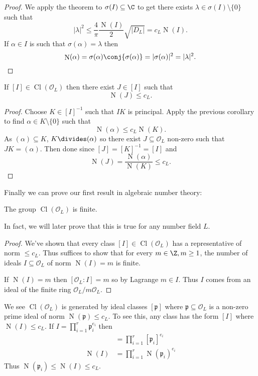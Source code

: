 \documentclass[a4paper]{article}
\renewcommand*{\O}{\mathcal{O}}
\DeclareMathOperator{\n}{N}
\DeclareMathOperator{\Cl}{Cl} %
\begin{document}
\begin{proof}
  We apply the theorem to \(\sigma(I) \subseteq \C\) to get there exists \(\lambda \in \sigma(I) \setminus \{0\}\) such that
  \[
    |\lambda|^2 \leq \frac{4}{\pi} \frac{\n(I)}{2} \sqrt{|D_L|} = c_L \n(I).
  \]
  If \(\alpha \in I\) is such that \(\sigma(\alpha) = \lambda\) then
  \[
    \n(\alpha)
    = \sigma(\alpha) \conj{\sigma(\alpha)}
    = |\sigma(\alpha)|^2
    = |\lambda|^2.
  \]
\end{proof}

\begin{corollary}
  If \([I] \in \Cl(\O_L)\) then there exist \(J \in [I]\) such that
  \[
    \n(J) \leq c_L.
  \]
\end{corollary}

\begin{proof}
  Choose \(K \in [I]^{-1}\) such that \(IK\) is principal. Apply the previous corollary to find \(\alpha \in K \setminus \{0\}\) such that
  \[
    \n(\alpha) \leq c_L \n(K).
  \]
  As \((\alpha) \subseteq K\), \(K \divides (\alpha)\) so there exist \(J \subseteq \O_L\) non-zero such that \(JK = (\alpha)\). Then done since \([J] = [K]^{-1} = [I]\) and
  \[
    \n(J) = \frac{\n(\alpha)}{\n(K)} \leq c_L.
  \]
\end{proof}

Finally we can prove our first result in algebraic number theory:

\begin{theorem}
  The group \(\Cl(\O_L)\) is finite.
\end{theorem}

In fact, we will later prove that this is true for any number field \(L\).

\begin{proof}
  We've shown that every class \([I] \in \Cl(\O_L)\) has a representative of norm \(\leq c_L\). Thus suffices to show that for every \(m \in \Z, m \geq 1\), the number of ideals \(I \subseteq \O_L\) of norm \(\n(I) = m\) is finite.

  If \(\n(I) = m\) then \([\O_L:I] = m\) so by Lagrange \(m \in I\). Thus \(I\) comes from an ideal of the finite ring \(\O_L/m\O_L\).
\end{proof}

\begin{note}
  We see \(\Cl(\O_L)\) is generated by ideal classes \([\mathfrak p]\) where \(\mathfrak p \subseteq \O_L\) is a non-zero prime ideal of norm \(\n(\mathfrak p) \leq c_L\). To see this, any class has the form \([I]\) where \(\n(I) \leq c_L\). If \(I = \prod_{i = 1}^r \mathfrak p_i^{e_i}\) then
  \begin{align*}
    [I] &= \prod_{i = 1}^r [\mathfrak p_i]^{e_i} \\
    \n(I) &= \prod_{i = 1}^r \n(\mathfrak p_i)^{e_i}
  \end{align*}
  Thus \(\n(\mathfrak p_i) \leq \n(I) \leq c_L\).
\end{note}
\end{document}
